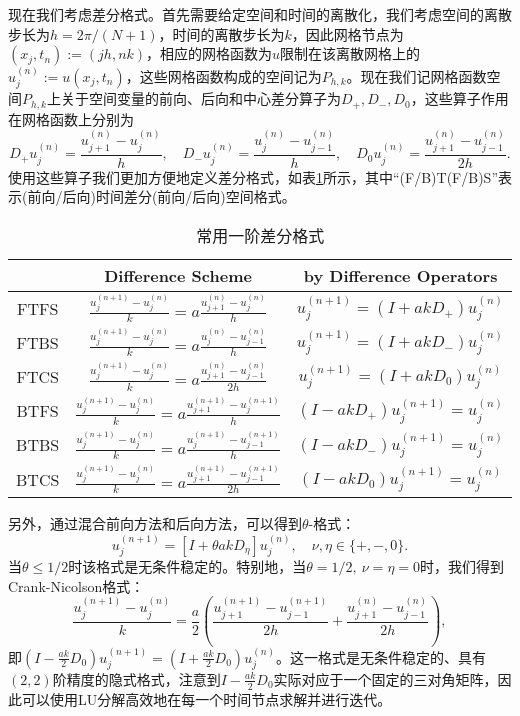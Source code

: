 \documentclass[a4paper,10pt]{ctexart}
\begin{document}
现在我们考虑差分格式。首先需要给定空间和时间的离散化，我们考虑空间的离散步长为$ h = 2\pi / (N+1) $，时间的离散步长为$ k $，因此网格节点为$ (x_j,t_n) :=(jh,nk) $，相应的网格函数为$ u $限制在该离散网格上的$ u^{(n)}_j := u(x_j,t_n) $，这些网格函数构成的空间记为$ P_{h,k} $。现在我们记网格函数空间$ P_{h,k} $上关于空间变量的前向、后向和中心差分算子为$ D_+,D_-,D_0 $，这些算子作用在网格函数上分别为
\[
    D_+u^{(n)}_j = \frac{u^{(n)}_{j+1}-u^{(n)}_j}{h},\quad D_-u^{(n)}_j = \frac{u^{(n)}_j-u^{(n)}_{j-1}}{h},\quad D_0u^{(n)}_j = \frac{u^{(n)}_{j+1}-u^{(n)}_{j-1}}{2h}.  
\]
使用这些算子我们更加方便地定义差分格式，如表\ref{tab:FDM}所示，其中“(F/B)T(F/B)S”表示(前向/后向)时间差分(前向/后向)空间格式。
\begin{table}[h]
    \centering
    \begin{tabular}{ccc}
        \toprule
        & Difference Scheme & by Difference Operators \\
        \midrule
        FTFS & $ \frac{u^{(n+1)}_j-u^{(n)}_j}{k} = a\frac{u^{(n)}_{j+1}-u^{(n)}_j}{h} $ & $ u^{(n+1)}_j = (I+ak D_+)u^{(n)}_j $ \\
        FTBS & $ \frac{u^{(n+1)}_j-u^{(n)}_j}{k} = a\frac{u^{(n)}_{j}-u^{(n)}_{j-1}}{h} $ & $ u^{(n+1)}_j = (I+ak D_-)u^{(n)}_j $\\
        FTCS & $ \frac{u^{(n+1)}_j-u^{(n)}_j}{k} = a\frac{u^{(n)}_{j+1}-u^{(n)}_{j-1}}{2h} $ & $ u^{(n+1)}_j = (I+ak D_0)u^{(n)}_j $\\
        BTFS & $ \frac{u^{(n+1)}_j-u^{(n)}_j}{k} = a\frac{u^{(n+1)}_{j+1}-u^{(n+1)}_j}{h} $ & $ (I-ak D_+)u^{(n+1)}_j = u^{(n)}_j $\\
        BTBS & $ \frac{u^{(n+1)}_j-u^{(n)}_j}{k} = a\frac{u^{(n+1)}_{j}-u^{(n+1)}_{j-1}}{h} $ & $ (I-ak D_-)u^{(n+1)}_j = u^{(n)}_j $\\
        BTCS & $ \frac{u^{(n+1)}_j-u^{(n)}_j}{k} = a\frac{u^{(n+1)}_{j+1}-u^{(n+1)}_{j-1}}{2h} $ & $ (I-ak D_{0})u^{(n+1)}_j = u^{(n)}_j $\\
        \bottomrule
    \end{tabular}
    \caption{常用一阶差分格式}
    \label{tab:FDM}
\end{table}

另外，通过混合前向方法和后向方法，可以得到$ \theta $-格式：
\begin{equation}
    [I-(1-\theta)akD_\nu]u^{(n+1)}_j = [I+\theta akD_\eta]u^{(n)}_j,\quad \nu,\eta\in \{+,-,0\}.
\end{equation}
当$ \theta\leqslant 1/2 $时该格式是无条件稳定的。特别地，当$ \theta = 1 / 2,\ \nu=\eta=0 $时，我们得到Crank-Nicolson格式：
\begin{equation}
    \frac{u^{(n+1)}_j-u^{(n)}_j}{k} = \frac{a}{2}\left( \frac{u^{(n+1)}_{j+1}-u^{(n+1)}_{j-1}}{2h}+\frac{u^{(n)}_{j+1}-u^{(n)}_{j-1}}{2h} \right),
\end{equation}
即$ (I-\frac{ak}{2}D_0)u^{(n+1)}_j = (I+\frac{ak}{2}D_0)u^{(n)}_j $。这一格式是无条件稳定的、具有$ (2,2) $阶精度的隐式格式，注意到$ I-\frac{ak}{2}D_0 $实际对应于一个固定的三对角矩阵，因此可以使用LU分解高效地在每一个时间节点求解并进行迭代。
\end{document}
